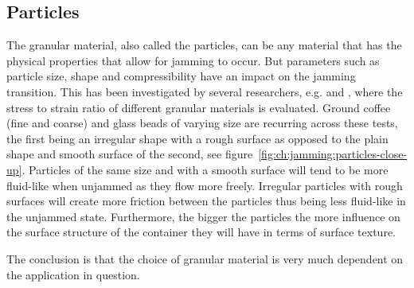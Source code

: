 \subsection{Particles}
\label{ch:jamming:particles}
The granular material, also called the particles, can be any material that has the physical properties that allow for jamming to occur. 
But parameters such as particle size, shape and compressibility have an impact on the jamming transition. 
This has been investigated by several researchers, e.g. \cite{cheng2012design} and \cite{steltz2010jamming}, where the stress to strain ratio of different granular materials is evaluated. 
Ground coffee (fine and coarse) and glass beads of varying size are recurring across these tests, the first being an irregular shape with a rough surface as opposed to the plain shape and smooth surface of the second, see figure~\ref{fig:ch:jamming:particles-close-up}. 
Particles of the same size and with a smooth surface will tend to be more fluid-like when unjammed as they flow more freely. 
Irregular particles with rough surfaces will create more friction between the particles thus being less fluid-like in the unjammed state.
Furthermore, the bigger the particles the more influence on the surface structure of the container they will have in terms of surface texture.

The conclusion is that the choice of granular material is very much dependent on the application in question. 

